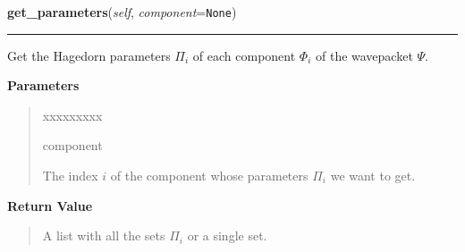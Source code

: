     \label{HagedornMultiWavepacket:HagedornMultiWavepacket:get_parameters}

    \vspace{0.5ex}

\hspace{.8\funcindent}\begin{boxedminipage}{\funcwidth}

    \raggedright \textbf{get\_parameters}(\textit{self}, \textit{component}={\tt None})

    \vspace{-1.5ex}

    \rule{\textwidth}{0.5\fboxrule}
\setlength{\parskip}{2ex}
    Get the Hagedorn parameters $\Pi_i$ of each component
    $\Phi_i$ of the wavepacket $\Psi$.

\setlength{\parskip}{1ex}
      \textbf{Parameters}
      \vspace{-1ex}

      \begin{quote}
        \begin{Ventry}{xxxxxxxxx}

          \item[component]

          The index $i$ of the component whose parameters
          $\Pi_i$ we want to get.

        \end{Ventry}

      \end{quote}

      \textbf{Return Value}
    \vspace{-1ex}

      \begin{quote}
      A list with all the sets $\Pi_i$ or a single set.

      \end{quote}

    \end{boxedminipage}

    \label{HagedornMultiWavepacket:HagedornMultiWavepacket:set_parameters}

    \vspace{0.5ex}

